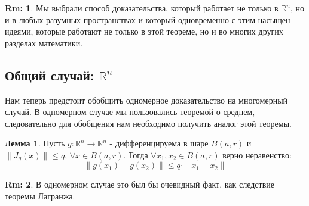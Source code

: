 \documentclass[12pt]{article}
\newcommand{\MR}{\mathbb{R}}
\theoremstyle{definition}
\newtheorem{rem}{Rm:}
\newtheorem{lemma}{Лемма}
\begin{document}
\begin{rem}
	Мы выбрали способ доказательства, который работает не только в $\MR^n$, но и в любых разумных пространствах и который одновременно с этим насыщен идеями, которые работают не только в этой теореме, но и во многих других разделах математики.
\end{rem}

\newpage
\subsection*{Общий случай: $\MR^n$}
Нам теперь предстоит обобщить одномерное доказательство на многомерный случай. В одномерном случае мы пользовались теоремой о среднем, следовательно для обобщения нам необходимо получить аналог этой теоремы. 
\begin{lemma}
	Пусть $g \colon \MR^n \to \MR^n$ - дифференцируема в шаре $B(a,r)$ и  $\|J_g(x)\|\leq q, \, \forall x \in B(a,r)$. Тогда $\forall x_1, x_2 \in B(a,r)$ верно неравенство: 
	$$
		\|g(x_1) - g(x_2)\| \leq q {\cdot} \|x_1 - x_2\|
	$$
\end{lemma}
\begin{rem}
	В одномерном случае это был бы очевидный факт, как следствие теоремы Лагранжа.
\end{rem}
\end{document}
